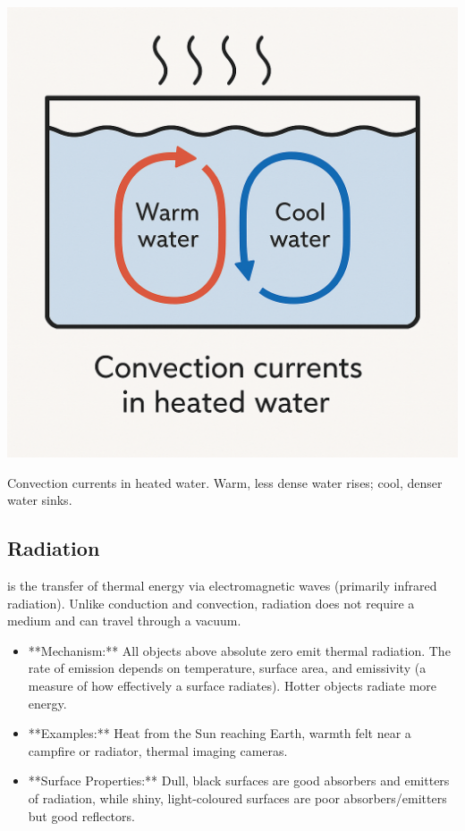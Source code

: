 \begin{marginfigure}[-10pt]
\includegraphics[width=\linewidth]{convection_currents.png} %
\caption{Convection currents in heated water. Warm, less dense water rises; cool, denser water sinks.}
\label{fig:convection}
\end{marginfigure}

\subsection{Radiation}
\FloatBarrier

 is the transfer of thermal energy via electromagnetic waves (primarily infrared radiation). Unlike conduction and convection, radiation does not require a medium and can travel through a vacuum.
\begin{itemize}
    \item **Mechanism:** All objects above absolute zero emit thermal radiation. The rate of emission depends on temperature, surface area, and emissivity (a measure of how effectively a surface radiates). Hotter objects radiate more energy.
    \item **Examples:** Heat from the Sun reaching Earth, warmth felt near a campfire or radiator, thermal imaging cameras.
    \item **Surface Properties:** Dull, black surfaces are good absorbers and emitters of radiation, while shiny, light-coloured surfaces are poor absorbers/emitters but good reflectors.
\end{itemize}

